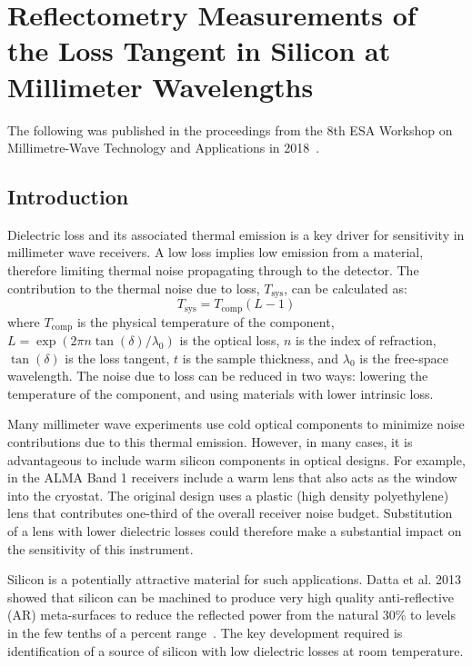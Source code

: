 \chapter{Reflectometry Measurements of the Loss Tangent in Silicon at Millimeter Wavelengths}
\label{ch:si}
The following was published in the proceedings from the 8th ESA Workshop on Millimetre-Wave Technology and Applications in 2018~\cite{ches18}.
\section{Introduction}
Dielectric loss and its associated thermal emission is a key driver for sensitivity in millimeter wave receivers. A low loss implies low emission from a material, therefore limiting thermal noise propagating through to the detector. The
contribution to the thermal noise due to loss,  $T_{\text{sys}}$, can be calculated as:
\begin{equation}
    T_{\text{sys}}=T_{\text{comp}}(L-1)
\end{equation}
where $T_{\text{comp}}$ is the physical temperature of the component, $L=\exp(2\pi n \tan(\delta)/\lambda_0)$ is the optical loss, $n$ is the index of refraction, $\tan(\delta)$ is the loss tangent, $t$ is the sample thickness, and $\lambda_0$ is the free-space wavelength. The noise due to loss can be reduced in two ways: lowering the temperature of the component, and using materials with lower intrinsic loss. 

Many millimeter wave experiments use cold optical components to minimize noise contributions due to this thermal emission. However, in many cases, it is advantageous to include warm silicon components in optical designs. For example, in the ALMA Band 1 receivers include a warm lens that also acts as the window into the cryostat. The original design uses a plastic (high density polyethylene) lens that contributes one-third of the overall receiver noise budget. Substitution of a lens with lower dielectric losses could therefore make a substantial impact on the sensitivity of this instrument.

Silicon is a potentially attractive material for such applications. Datta et al. 2013 showed that silicon can be machined to produce very high quality anti-reflective (AR) meta-surfaces to reduce the reflected power from the natural 30\% to levels in the few tenths of a percent range~\cite{Datta:13}. The key development required is identification of a source of silicon with low dielectric losses at room temperature.

